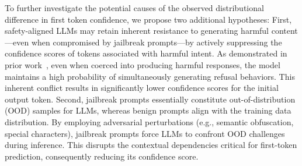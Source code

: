 \documentclass{article}
\begin{document}
To further investigate the potential causes of the observed distributional difference in first token confidence, we propose two additional hypotheses: First, safety-aligned LLMs may retain inherent resistance to generating harmful content—even when compromised by jailbreak prompts—by actively suppressing the confidence scores of tokens associated with harmful intent. As demonstrated in prior work~\citep{xu2024safedecoding}, even when coerced into producing harmful responses, the model maintains a high probability of simultaneously generating refusal behaviors. This inherent conflict results in significantly lower confidence scores for the initial output token. Second, jailbreak prompts essentially constitute out-of-distribution (OOD) samples for LLMs, whereas benign prompts align with the training data distribution. By employing adversarial perturbations (e.g., semantic obfuscation, special characters), jailbreak prompts force LLMs to confront OOD challenges during inference. This disrupts the contextual dependencies critical for first-token prediction, consequently reducing its confidence score.
\end{document}
